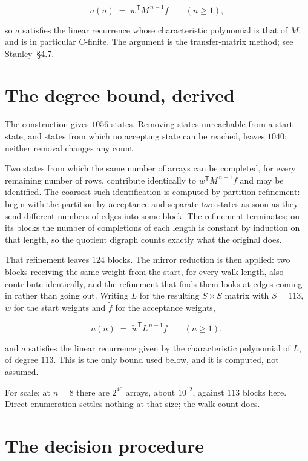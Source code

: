 \documentclass[11pt]{article}
\theoremstyle{definition}
\begin{document}
\[a(n) \;=\; w^{\mathsf T} M^{\,n-1} f \qquad (n \ge 1),\]

so $a$ satisfies the linear recurrence whose characteristic polynomial is that of $M$, and is in particular C-finite. The argument is the transfer-matrix method; see Stanley~\S4.7.

\section{The degree bound, derived}

The construction gives $1056$ states. Removing states unreachable from a start state, and states from which no accepting state can be reached, leaves $1040$; neither removal changes any count.

Two states from which the same number of arrays can be completed, for every remaining number of rows, contribute identically to $w^{\mathsf T}M^{\,n-1}f$ and may be identified. The coarsest such identification is computed by partition refinement: begin with the partition by acceptance and separate two states as soon as they send different numbers of edges into some block. The refinement terminates; on its blocks the number of completions of each length is constant by induction on that length, so the quotient digraph counts exactly what the original does.

That refinement leaves $124$ blocks. The mirror reduction is then applied: two blocks receiving the same weight from the start, for every walk length, also contribute identically, and the refinement that finds them looks at edges coming in rather than going out. Writing $L$ for the resulting $S \times S$ matrix with $S = 113$, $\tilde w$ for the start weights and $\tilde f$ for the acceptance weights,

\[a(n) \;=\; \tilde w^{\mathsf T} L^{\,n-1} \tilde f \qquad (n \ge 1),\]

and $a$ satisfies the linear recurrence given by the characteristic polynomial of $L$, of degree $113$. This is the only bound used below, and it is computed, not assumed.

For scale: at $n = 8$ there are $2^{40}$ arrays, about $10^{12}$, against $113$ blocks here. Direct enumeration settles nothing at that size; the walk count does.

\section{The decision procedure}
\end{document}

